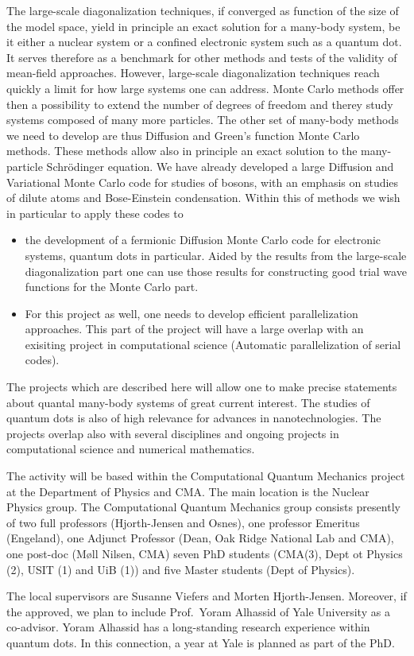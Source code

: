 The large-scale diagonalization techniques, if converged as function of the size of the model space, yield in principle
an exact solution for a many-body system, be it either a nuclear system or a confined electronic system such as a quantum dot.
It serves therefore as a benchmark  for other methods and tests of the validity of mean-field approaches.
However, large-scale diagonalization techniques reach quickly a limit for how large systems one  can address.
Monte Carlo methods offer then a possibility to extend the number of degrees of freedom and therey study systems composed
of many more particles.
The other set of many-body methods we need to develop are thus Diffusion and Green's function Monte Carlo methods.
These methods allow also in principle an exact solution to the many-particle Schr\"odinger equation.
We have already developed a large Diffusion and Variational Monte Carlo code for studies of bosons,  with an
emphasis on  studies of dilute atoms and Bose-Einstein condensation.
Within this of methods we wish in particular to apply these codes to 
\begin{itemize} 
\item the development  of a fermionic Diffusion Monte Carlo code for electronic systems, quantum dots in particular.
Aided by the results from the large-scale diagonalization part one can use those results for 
constructing good trial wave functions for the Monte Carlo part.
\item  For this project as well, one needs to develop 
efficient parallelization approaches. This part of the project will have a large overlap with an exisiting 
project in computational science (Automatic parallelization of serial codes).
\end{itemize}


The projects which are described here will allow one to make precise statements about quantal many-body systems of great
current interest. The studies of quantum dots is also of high relevance for advances in nanotechnologies.
The projects overlap also with several disciplines and ongoing projects in computational science and numerical mathematics.

The activity will be based within the Computational Quantum Mechanics project at the Department of Physics and 
CMA. The main location is the Nuclear Physics group. 
The Computational Quantum Mechanics group consists  
presently of two full professors (Hjorth-Jensen and Osnes), one professor Emeritus (Engeland), 
one Adjunct Professor (Dean, Oak Ridge National Lab and CMA), one post-doc (M\o ll Nilsen, CMA) seven PhD
students (CMA(3), Dept ot Physics (2), USIT (1) and UiB (1)) and five Master students (Dept of Physics).  

The local supervisors are Susanne Viefers and Morten Hjorth-Jensen.
Moreover, if the approved, we plan to include Prof.~Yoram Alhassid of Yale University as a co-advisor.
Yoram Alhassid has a long-standing research experience within quantum dots. In this connection, a year at
Yale is planned as part of the PhD.


